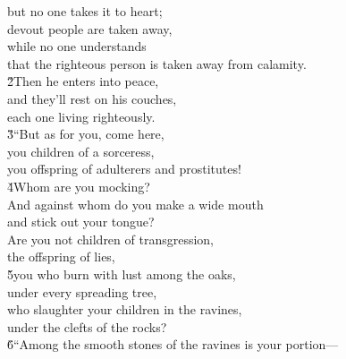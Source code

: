 \begin{poetry}
\poemll    but no one takes it to heart; \\
\poeml devout people are taken away, \\
\poemll    while no one understands \\
\poemlll       that the righteous person is taken away from calamity. \\
\poeml \v{2}Then he enters into peace, \\
\poemll    and they'll rest on his couches, \\
\poemlll       each one living righteously. \\
\poeml \v{3}``But as for you, come here, \\
\poemll    you children of a sorceress, \\
\poemlll       you offspring of adulterers and prostitutes! \\
\poeml \v{4}Whom are you mocking? \\
\poemll    And against whom do you make a wide mouth \\
\poemlll       and stick out your tongue? \\
\poeml Are you not children of transgression, \\
\poemll    the offspring of lies, \\
\poeml \v{5}you who burn with lust among the oaks, \\
\poemll    under every spreading tree, \\
\poeml who slaughter your children in the ravines, \\
\poemll    under the clefts of the rocks? \\
\poeml \v{6}``Among the smooth stones of the ravines is your portion--- \\

\end{poetry}
